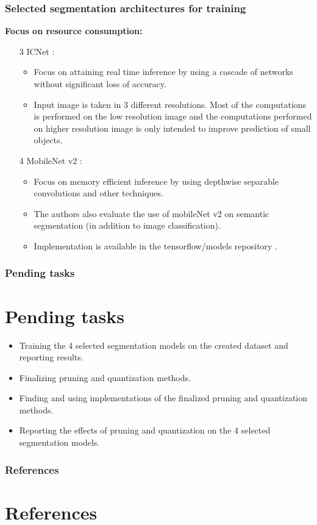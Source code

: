 \documentclass{beamer}
\begin{document}
\begin{frame}
	\frametitle{Selected segmentation architectures for training}
		\textbf{Focus on resource consumption:}
		\vspace{3mm}
		\begin{itemize}
			\item[3] ICNet \cite{DBLP:journals/corr/ZhaoQSSJ17}:
				\begin{itemize}
					\item Focus on attaining real time inference by using a cascade of networks without significant loss of accuracy. 
					\vspace{2mm}
					\item Input image is taken in 3 different resolutions. Most of the computations is performed on the low resolution image and the computations performed on higher resolution image is only intended to improve prediction of small objects.
					\vspace{2mm}
				\end{itemize}
			\vspace{3mm}
			\item[4] MobileNet v2 \cite{mobilenetv22018}:
				\begin{itemize}
					\item Focus on memory efficient inference by using depthwise separable convolutions and other techniques.
					\vspace{2mm}
					\item The authors also evaluate the use of mobileNet v2 on semantic segmentation (in addition to image classification).
					\vspace{2mm}
					\item Implementation is available in the tensorflow/models repository \cite{tf_models_mobilenetv2}.
				\end{itemize}
		\end{itemize}
\end{frame}

\begin{frame}
	\frametitle{Pending tasks}
	\section{Pending tasks}
		\begin{itemize}
			\item Training the 4 selected segmentation models on the created dataset and reporting results.
			\item Finalizing pruning and quantization methods.
			\item Finding and using implementations of the finalized pruning and quantization methods.
			\item Reporting the effects of pruning and quantization on the 4 selected segmentation models.
		\end{itemize}
\end{frame}

\begin{frame}
	\frametitle{References}
	\section{References}
	\printbibliography[title={References}]   
\end{frame}
\end{document}

